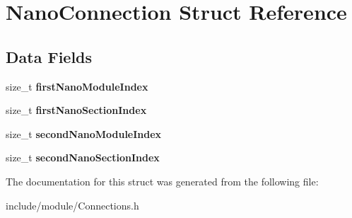 \hypertarget{struct_nano_connection}{}\section{Nano\+Connection Struct Reference}
\label{struct_nano_connection}
\subsection*{Data Fields}
\begin{DoxyCompactItemize}
\item 
\hypertarget{struct_nano_connection_a96f8e0e51ad90654abfe1bd32e54b1a4}{}\label{struct_nano_connection_a96f8e0e51ad90654abfe1bd32e54b1a4} 
size\+\_\+t {\bfseries first\+Nano\+Module\+Index}
\item 
\hypertarget{struct_nano_connection_ae76497b1301d15956f7d8e5948fbe94b}{}\label{struct_nano_connection_ae76497b1301d15956f7d8e5948fbe94b} 
size\+\_\+t {\bfseries first\+Nano\+Section\+Index}
\item 
\hypertarget{struct_nano_connection_ac1ccc34a6f759813ea0ccb13e6316479}{}\label{struct_nano_connection_ac1ccc34a6f759813ea0ccb13e6316479} 
size\+\_\+t {\bfseries second\+Nano\+Module\+Index}
\item 
\hypertarget{struct_nano_connection_a4582e76650c52bbfc99ecc359b32e4cc}{}\label{struct_nano_connection_a4582e76650c52bbfc99ecc359b32e4cc} 
size\+\_\+t {\bfseries second\+Nano\+Section\+Index}
\end{DoxyCompactItemize}


The documentation for this struct was generated from the following file\+:\begin{DoxyCompactItemize}
\item 
include/module/Connections.\+h\end{DoxyCompactItemize}

